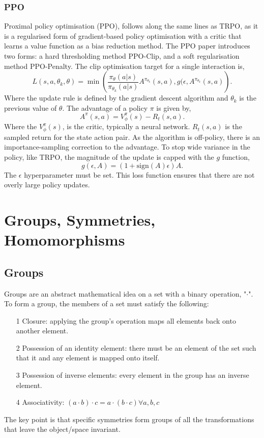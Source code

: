 \subsubsection{PPO}
Proximal policy optimisation (PPO), follows along the same lines as TRPO, as it is a regularised form of gradient-based policy optimisation with a critic that learns a value function as a bias reduction method. The PPO paper introduces two forms: a hard thresholding method PPO-Clip, and a soft regularisation method PPO-Penalty. The clip optimisation target for a single interaction is,
\begin{equation}
	L(s, a, \theta_k, \theta) = \min \left( \frac{\pi_\theta(a|s)}{\pi_{\theta_k}(a|s)} A^{\pi_{\theta_k}}(s,a), g(\epsilon, A^{\pi_{\theta_k}}(s, a) \right).
\end{equation}
Where the update rule is defined by the gradient descent algorithm and $\theta_k$ is the previous value of $\theta$. The advantage of a policy $\pi$ is given by,
\begin{equation}
	A^{\pi}(s, a) = V^\pi _\phi(s) - R_t(s, a).
\end{equation}
Where the $V^\pi _ \phi(s)$, is the critic, typically a neural network. $R_t(s, a)$ is the sampled return for the state action pair. As the algorithm is off-policy, there is an importance-sampling correction to the advantage. To stop wide variance in the policy, like TRPO, the magnitude of the update is capped with the $g$ function,
\begin{equation}
	g(\epsilon, A) = (1 + \text{sign}(A)\epsilon)A.
\end{equation}
The $\epsilon$ hyperparameter must be set. This loss function ensures that there are not overly large policy updates.


\section{Groups, Symmetries, Homomorphisms}

\subsection{Groups}
Groups are an abstract mathematical idea on a set with a binary operation, "$\cdot$". To form a group, the members of a set must satisfy the following:
\begin{itemize}
	\item[1] Closure: applying the group's operation maps all elements back onto another element.
	\item[2] Possession of an identity element: there must be an element of the set such that it and any element is mapped onto itself.
	\item[3] Possession of inverse elements: every element in the group has an inverse element.
	\item [4] Associativity: $(a \cdot b) \cdot c = a \cdot (b \cdot c) \forall a, b, c$
\end{itemize}
The key point is that specific symmetries form groups of all the transformations that leave the object/space invariant.

